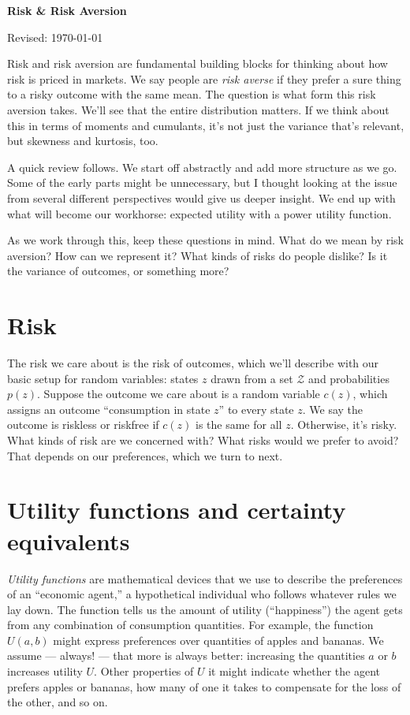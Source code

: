 

\centerline{\Large \bf Risk \& Risk Aversion}
\centerline{Revised: \today}

\medskip
Risk and risk aversion are fundamental building blocks
for thinking about how risk is priced in markets.
We say people are {\it risk averse\/} if they
prefer a sure thing to a risky outcome with the same mean.
The question is what form this risk aversion takes.
We'll see that the entire distribution matters.
If we think about this in terms of moments and cumulants,
it's not just the variance that's relevant,
but skewness and kurtosis, too.

A quick review follows.
We start off abstractly and add more structure as we go.
Some of the early parts might be unnecessary,
but I thought looking at the issue from several different
perspectives would give us deeper insight.
We end up with what will become our workhorse:
expected utility with a power utility function.

As we work through this, keep these questions in mind.
What do we mean by risk aversion?
How can we represent it?
What kinds of risks do people dislike?
Is it the variance of outcomes, or something more?


\section{Risk}

The risk we care about is the risk of outcomes,
which we'll describe with our basic setup for random variables:
states $z$ drawn from a set $\mathcal{Z}$ and probabilities $p(z)$.
Suppose the outcome we care about is a random variable $c(z)$,
which assigns an outcome ``consumption in state $z$''
to every state $z$.
We say the outcome is riskless or riskfree if $c(z)$ is
the same for all $z$.
Otherwise, it's risky.
What kinds of risk are we concerned with?
What risks would we prefer to avoid?
That depends on our preferences, which we turn to next.


\section{Utility functions and certainty equivalents}

{\it Utility functions\/} are mathematical devices that we use
to describe the preferences of an ``economic agent,''
a hypothetical individual who follows whatever rules we lay down.
The function tells us the amount of utility (``happiness'')
the agent gets from any combination of consumption quantities.
For example, the function $U(a,b)$ might express preferences
over quantities of apples and bananas.
We assume --- always! --- that more is always better:
increasing the quantities $a$ or $b$ increases utility $U$.
Other properties of $U$ it might indicate
whether the agent prefers apples or bananas,
how many of one it takes to compensate for the loss of the other,
and so on.

